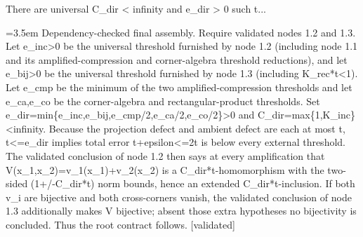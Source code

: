\documentclass{article}
\newcommand{\step}[1]{\par\noindent\hangindent=3.5em\hangafter=1%
  \makebox[3.5em][l]{\textbf{#1.}}}
\newcommand{\steptag}[1]{\hfill{\small\textsf{[#1]}}}
\begin{document}
\begin{proofbox}{There are universal C\_dir < infinity and e\_dir > 0 such t...}
\step{1.4.1} Dependency-checked final assembly. Require validated nodes 1.2 and 1.3. Let e\_inc>0 be the universal threshold furnished by node 1.2 (including node 1.1 and its amplified-compression and corner-algebra threshold reductions), and let e\_bij>0 be the universal threshold furnished by node 1.3 (including K\_rec*t<1). Let e\_cmp be the minimum of the two amplified-compression thresholds and let e\_ca,e\_co be the corner-algebra and rectangular-product thresholds. Set e\_dir=min\{e\_inc,e\_bij,e\_cmp/2,e\_ca/2,e\_co/2\}>0 and C\_dir=max\{1,K\_inc\}<infinity. Because the projection defect and ambient defect are each at most t, t<=e\_dir implies total error t+epsilon<=2t is below every external threshold. The validated conclusion of node 1.2 then says at every amplification that V(x\_1,x\_2)=v\_1(x\_1)+v\_2(x\_2) is a C\_dir*t-homomorphism with the two-sided (1+/-C\_dir*t) norm bounds, hence an extended C\_dir*t-inclusion. If both v\_i are bijective and both cross-corners vanish, the validated conclusion of node 1.3 additionally makes V bijective; absent those extra hypotheses no bijectivity is concluded. Thus the root contract follows. \steptag{validated} \\[4pt]
\end{proofbox}
\end{document}
